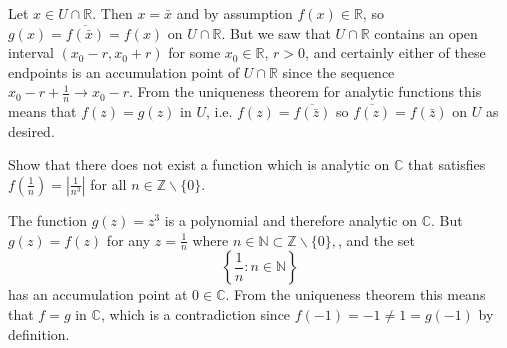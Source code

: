 \documentclass{article}
\newcounter{Problem}
\newenvironment{Problem}{\begin{Exercise}[name={Problem},
                                          counter={Problem}]}
                        {\end{Exercise}}
\begin{document}
\begin{Answer}
\begin{enumerate}
{      Let $x \in U \cap \mathbb{R}$. Then
      $x = \bar{x}$ and by assumption $f(x) \in \mathbb{R}$,
      so $g(x) = \overline{f(\bar{x})} = f(x)$ on $U \cap \mathbb{R}$.
      But we saw that $U \cap \mathbb{R}$ contains an open
      interval $(x_0 - r, x_0 + r)$ for some $x_0 \in \mathbb{R}$,
      $r > 0$, and certainly either of these endpoints is an
      accumulation point of $U \cap \mathbb{R}$ since
      the sequence $x_0 - r + \frac{1}{n} \to x_0 - r$.
      From the uniqueness theorem for analytic functions this means
      that $f(z) = g(z)$ in $U$, i.e. $f(z) = \overline{f(\bar{z})}$ so
      $\overline{f(z)} = f(\bar{z})$ on $U$ as desired.
    }
  \end{enumerate}
\end{Answer}

\begin{Problem}
  Show that there does not exist a function which is analytic on
  $\mathbb{C}$ that satisfies
  $f\left(\frac{1}{n}\right) = \left|\frac{1}{n^3}\right|$ for all
  $n \in \mathbb{Z} \backslash \{ 0 \}$.
\end{Problem}

\begin{Answer}
  The function $g(z) = z^3$ is a polynomial and therefore analytic
  on $\mathbb{C}$. But $g(z) = f(z)$ for any $z = \frac{1}{n}$ where
  $n \in \mathbb{N} \subset \mathbb{Z} \backslash \{0\},$, and the set
  $$
  \left\{\frac{1}{n} : n \in \mathbb{N} \right\}
  $$
  has an accumulation point at $0 \in \mathbb{C}$. From the uniqueness theorem
  this means that $f = g$ in $\mathbb{C}$, which is a contradiction
  since $f(-1) = -1 \neq 1 = g(-1)$ by definition.
\end{Answer}
\end{document}
